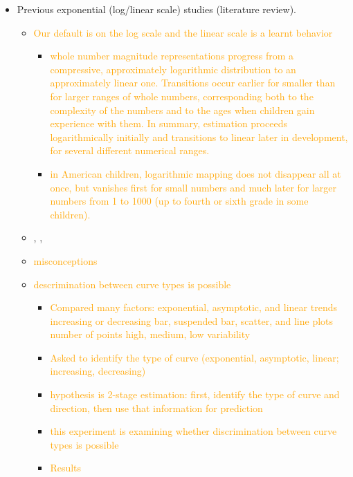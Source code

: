 \documentclass[]{interact}
\theoremstyle{plain}%
\theoremstyle{definition}
\theoremstyle{remark}
\def\tightlist{}
\begin{document}
\begin{itemize}
\item
  Previous exponential (log/linear scale) studies (literature review).

  \begin{itemize}
  \item
    \textcolor{Orange}{Our default is on the log scale and the linear scale is a learnt behavior}
    \citep{varshney_why_2013}

    \begin{itemize}
    \tightlist
    \item
      \textcolor{Orange}{whole number magnitude representations progress from a compressive, approximately logarithmic distribution to an approximately linear one. Transitions occur earlier for smaller than for larger ranges of whole numbers, corresponding both to the complexity of the numbers and to the ages when children gain experience with them. In summary, estimation proceeds logarithmically initially and transitions to linear later in development, for several different numerical ranges.}
      \citep{siegler_numerical_2017}
    \item
      \textcolor{Orange}{in American children, logarithmic mapping does not disappear all at once, but vanishes first for small numbers and much later for larger numbers from 1 to 1000 (up to fourth or sixth grade in some children).}
      \citep{dehaeneLogLinearDistinct2008}
    \end{itemize}
  \item
    \citep{jones_generalized_1979}, \citep{jones_polynomial_1977},
    \citep{wagenaar_extrapolation_1978}
  \item
    \textcolor{Orange}{misconceptions} \citep{menge_logarithmic_2018}
  \item
    \textcolor{Orange}{descrimination between curve types is possible}
    \citep{best_perception_2007}

    \begin{itemize}
    \item
      \textcolor{Orange}{Compared many factors: exponential, asymptotic, and linear trends increasing or decreasing bar, suspended bar, scatter, and line plots number of points high, medium, low variability}
    \item
      \textcolor{Orange}{Asked to identify the type of curve (exponential, asymptotic, linear; increasing, decreasing)}
    \item
      \textcolor{Orange}{hypothesis is 2-stage estimation: first, identify the type of curve and direction, then use that information for prediction}
    \item
      \textcolor{Orange}{this experiment is examining whether discrimination between curve types is possible}
    \item
      \textcolor{Orange}{Results}


\end{itemize}
\end{itemize}
\end{itemize}
\end{document}
